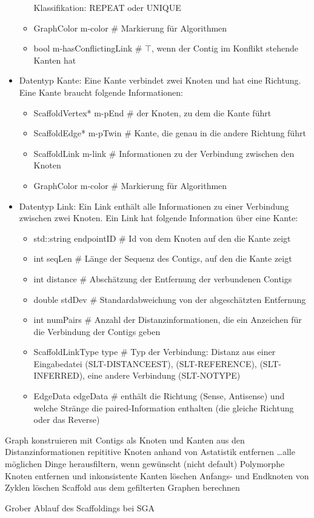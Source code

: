 \documentclass[a4paper,10pt,parskip]{scrartcl}
\begin{document}
\begin{itemize}
\begin{itemize}
    Klassifikation: REPEAT oder UNIQUE
  \item GraphColor m-color \# Markierung für Algorithmen
  \item bool m-hasConflictingLink \# $\top$, wenn der Contig im
    Konflikt stehende Kanten hat
  \end{itemize}
\item Datentyp Kante: Eine Kante verbindet zwei Knoten und hat eine
  Richtung. Eine Kante braucht folgende Informationen:
  \begin{itemize}
  \item ScaffoldVertex* m-pEnd \# der Knoten, zu dem die Kante führt
  \item ScaffoldEdge* m-pTwin \# Kante, die genau in die andere
    Richtung führt
  \item ScaffoldLink m-link \# Informationen zu der Verbindung
    zwischen den Knoten
  \item GraphColor m-color \# Markierung für Algorithmen
  \end{itemize}
\item Datentyp Link: Ein Link enthält alle Informationen zu einer
  Verbindung zwischen zwei Knoten. Ein Link hat folgende Information
  über eine Kante:
  \begin{itemize}
  \item std::string endpointID \# Id von dem Knoten auf den die Kante
    zeigt
  \item int seqLen \# Länge der Sequenz des Contigs, auf den die Kante
    zeigt
  \item int distance \# Abschätzung der Entfernung der verbundenen
    Contigs
  \item double stdDev \# Standardabweichung von der abgeschätzten
    Entfernung
  \item int numPairs \# Anzahl der Distanzinformationen, die ein
    Anzeichen für die Verbindung der Contigs geben
  \item ScaffoldLinkType type \# Typ der Verbindung: Distanz aus einer
    Eingabedatei (SLT-DISTANCEEST), (SLT-REFERENCE), (SLT-INFERRED),
    eine andere Verbindung (SLT-NOTYPE)
  \item EdgeData edgeData \# enthält die Richtung (Sense, Antisense)
    und welche Stränge die paired-Information enthalten (die gleiche
    Richtung oder das Reverse)
  \end{itemize}
\end{itemize}



\begin{algorithm}[H]
  \SetAlgoLined
  Graph konstruieren mit Contigs als Knoten und Kanten 
  aus den Distanzinformationen\;
  repititive Knoten anhand von Astatistik entfernen\;
  \dots alle möglichen Dinge herausfiltern, wenn gewünscht (nicht default)\;
  Polymorphe Knoten entfernen und inkonsistente Kanten löschen\;
  Anfangs- und Endknoten von Zyklen löschen\;
  Scaffold aus dem gefilterten Graphen berechnen\;
  \caption{Grober Ablauf des Scaffoldings bei SGA}
\end{algorithm}
\end{document}
